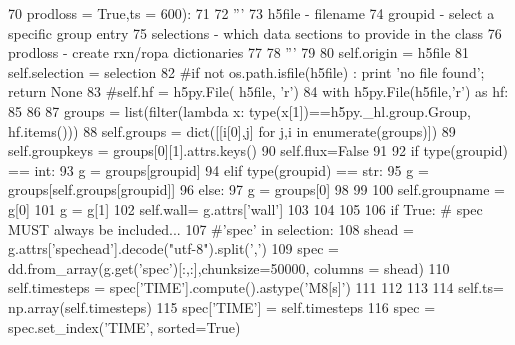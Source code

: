 \begin{DoxyCode}
70         prodloss = \textcolor{keyword}{True},ts = 600):
71 
72         \textcolor{stringliteral}{'''}
73 \textcolor{stringliteral}{        h5file     - filename}
74 \textcolor{stringliteral}{        groupid    - select a specific group entry}
75 \textcolor{stringliteral}{        selections - which data sections to provide in the class}
76 \textcolor{stringliteral}{        prodloss   - create rxn/ropa dictionaries}
77 \textcolor{stringliteral}{}
78 \textcolor{stringliteral}{        '''}
79 
80         self.origin = h5file
81         self.selection = selection
82         \textcolor{comment}{#if not os.path.isfile(h5file) : print 'no file found'; return None}
83         \textcolor{comment}{#self.hf = h5py.File( h5file, 'r')}
84         with h5py.File(h5file,\textcolor{stringliteral}{'r') as hf:}
85 \textcolor{stringliteral}{}
86 \textcolor{stringliteral}{}
87 \textcolor{stringliteral}{            groups = list(filter(}\textcolor{keyword}{lambda} x: type(x[1])==h5py.\_hl.group.Group, hf.items()))
88             self.groups = dict([[i[0],j] \textcolor{keywordflow}{for} j,i \textcolor{keywordflow}{in} enumerate(groups)])
89             self.groupkeys = groups[0][1].attrs.keys()
90             self.flux=\textcolor{keyword}{False}
91             
92             \textcolor{keywordflow}{if} type(groupid) == int: 
93                 g = groups[groupid]
94             \textcolor{keywordflow}{elif} type(groupid) == str: 
95                 g = groups[self.groups[groupid]]
96             \textcolor{keywordflow}{else}:
97                 g = groups[0]
98 
99 
100             self.groupname = g[0]
101             g = g[1]
102             self.wall= g.attrs[\textcolor{stringliteral}{'wall'}]
103 
104 
105 
106             \textcolor{keywordflow}{if} \textcolor{keyword}{True}: \textcolor{comment}{# spec MUST always be included...}
107                 \textcolor{comment}{#'spec' in selection:}
108                 shead = g.attrs[\textcolor{stringliteral}{'spechead'}].decode(\textcolor{stringliteral}{"utf-8"}).split(\textcolor{stringliteral}{','})
109                 spec = dd.from\_array(g.get(\textcolor{stringliteral}{'spec'})[:,:],chunksize=50000, columns = shead)
110                 self.timesteps = spec[\textcolor{stringliteral}{'TIME'}].compute().astype(\textcolor{stringliteral}{'M8[s]'})
111 
112 
113 
114                 self.ts= np.array(self.timesteps)
115                 spec[\textcolor{stringliteral}{'TIME'}] = self.timesteps
116                 spec = spec.set\_index(\textcolor{stringliteral}{'TIME'}, sorted=\textcolor{keyword}{True})

\end{DoxyCode}
